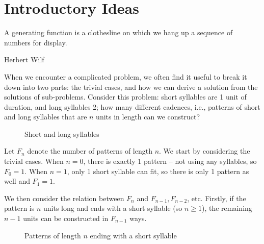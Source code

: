 \documentclass[a4paper, 12pt]{report}
\begin{document}

\addtocounter{page}{1}
\tableofcontents

\chapter{Introductory Ideas}\label{ch:intro}
\epigraph{A generating function is a clothesline on which we hang up a sequence of numbers for display.}{Herbert Wilf \autocite*[1]{wilf}}

When we encounter a complicated problem, we often find it useful to break it down into two parts: the trivial cases, and how we can derive a solution from the solutions of sub-problems. Consider this problem: short syllables are 1 unit of duration, and long syllables 2; how many different cadences, i.e., patterns of short and long syllables that are $n$ units in length can we construct?

\begin{figure}[h]
    \centering
    \caption{Short and long syllables}
    \label{fig:short_long}
\end{figure}

Let $F_n$ denote the number of patterns of length $n$. We start by considering the trivial cases. When $n = 0$, there is exactly 1 pattern -- not using any syllables, so $F_0 = 1$. When $n = 1$, only 1 short syllable can fit, so there is only 1 pattern as well and $F_1 = 1$.

We then consider the relation between $F_n$ and $F_{n - 1}, F_{n - 2}$, etc. Firstly, if the pattern is $n$ units long and ends with a short syllable (so $n \geq 1$), the remaining $n - 1$ units can be constructed in $F_{n - 1}$ ways.

\begin{figure}[h]
    \centering
    \caption{Patterns of length $n$ ending with a short syllable}
    \label{fig:end_with_short}
\end{figure}
\end{document}
